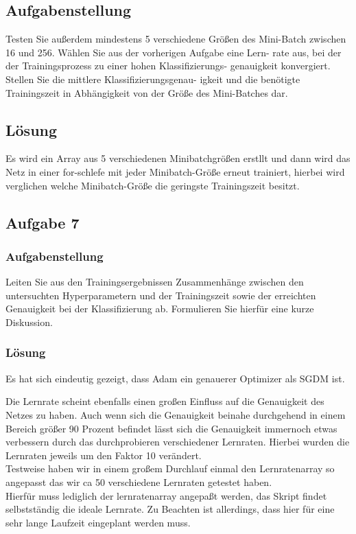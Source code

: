 \documentclass[8pt,a4paper]{article}
\begin{document}
\subsection{Aufgabenstellung}
Testen Sie außerdem mindestens 5 verschiedene Größen des Mini-Batch
zwischen 16 und 256. Wählen Sie aus der vorherigen Aufgabe eine Lern-
rate aus, bei der der Trainingsprozess zu einer hohen Klassifizierungs-
genauigkeit konvergiert. Stellen Sie die mittlere Klassifizierungsgenau-
igkeit und die benötigte Trainingszeit in Abhängigkeit von der Größe
des Mini-Batches dar.
\\

\subsection{Lösung}
Es wird ein Array aus 5 verschiedenen Minibatchgrößen erstllt und dann wird das Netz in einer for-schlefe mit jeder Minibatch-Größe erneut trainiert, hierbei wird verglichen welche Minibatch-Größe die geringste Trainingszeit besitzt.



\subsection{Aufgabe 7}
\subsubsection{Aufgabenstellung}
Leiten Sie aus den Trainingsergebnissen Zusammenhänge zwischen den
untersuchten Hyperparametern und der Trainingszeit sowie der erreichten Genauigkeit bei der Klassifizierung ab. Formulieren Sie hierfür eine
kurze Diskussion.
\subsubsection{Lösung}
Es hat sich eindeutig gezeigt, dass Adam ein genauerer Optimizer als SGDM ist.

Die Lernrate scheint ebenfalls einen großen Einfluss auf die Genauigkeit des Netzes zu haben.
Auch wenn sich die Genauigkeit beinahe durchgehend in einem Bereich größer 90 Prozent befindet lässt sich die Genauigkeit immernoch etwas verbessern durch das durchprobieren verschiedener Lernraten.
Hierbei wurden die Lernraten jeweils um den Faktor 10 verändert.\\

Testweise haben wir in einem großem Durchlauf einmal den Lernratenarray so angepasst das wir ca 50 verschiedene Lernraten getestet haben.\\
Hierfür muss lediglich der lernratenarray angepaßt werden, das Skript findet selbstständig die ideale Lernrate.
Zu Beachten ist allerdings, dass hier für eine sehr lange Laufzeit eingeplant werden muss.\\
\end{document}
